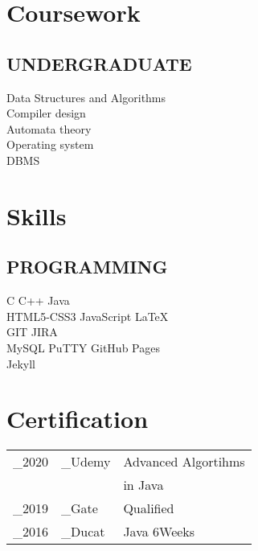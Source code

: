 \documentclass[]{deedy-resume-openfont}
\begin{document}
\begin{minipage}[t]{0.33\textwidth}
\sectionsep


\section{Coursework}
\subsection{UNDERGRADUATE}
Data Structures and Algorithms\\
Compiler design \\
Automata theory\\
Operating system\\
DBMS\\

\sectionsep


\section{Skills}
\subsection{PROGRAMMING}
C \textbullet{} C++ \textbullet{} Java \\
HTML5-CSS3 \textbullet{} JavaScript \textbullet{} \LaTeX\ \\
GIT \textbullet{} JIRA\\
MySQL \textbullet{} PuTTY \textbullet{} GitHub Pages\\
\textbullet{} Jekyll

\sectionsep


\section{Certification}
\begin{tabular}{r l l}
_{2020} & _{Udemy} & Advanced Algortihms \\
& & in Java \\
_{2019} & _{Gate} & Qualified\\
_{2016} & _{Ducat} & Java 6Weeks
\end{tabular}

\sectionsep

%
%

\end{minipage} 
\end{document}
